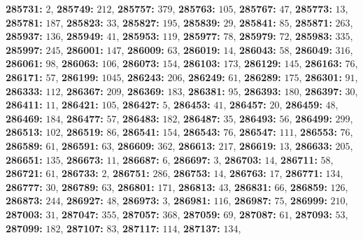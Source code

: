 \textsf{\bfseries 285731:} $2$, \textsf{\bfseries 285749:} $212$, \textsf{\bfseries 285757:} $379$, \textsf{\bfseries 285763:} $105$, \textsf{\bfseries 285767:} $47$, \textsf{\bfseries 285773:} $13$, \textsf{\bfseries 285781:} $187$, \textsf{\bfseries 285823:} $33$, \textsf{\bfseries 285827:} $195$, \textsf{\bfseries 285839:} $29$, \textsf{\bfseries 285841:} $85$, \textsf{\bfseries 285871:} $263$, \textsf{\bfseries 285937:} $136$, \textsf{\bfseries 285949:} $41$, \textsf{\bfseries 285953:} $119$, \textsf{\bfseries 285977:} $78$, \textsf{\bfseries 285979:} $72$, \textsf{\bfseries 285983:} $335$, \textsf{\bfseries 285997:} $245$, \textsf{\bfseries 286001:} $147$, \textsf{\bfseries 286009:} $63$, \textsf{\bfseries 286019:} $14$, \textsf{\bfseries 286043:} $58$, \textsf{\bfseries 286049:} $316$, \textsf{\bfseries 286061:} $98$, \textsf{\bfseries 286063:} $106$, \textsf{\bfseries 286073:} $154$, \textsf{\bfseries 286103:} $173$, \textsf{\bfseries 286129:} $145$, \textsf{\bfseries 286163:} $76$, \textsf{\bfseries 286171:} $57$, \textsf{\bfseries 286199:} $1045$, \textsf{\bfseries 286243:} $206$, \textsf{\bfseries 286249:} $61$, \textsf{\bfseries 286289:} $175$, \textsf{\bfseries 286301:} $91$, \textsf{\bfseries 286333:} $112$, \textsf{\bfseries 286367:} $209$, \textsf{\bfseries 286369:} $183$, \textsf{\bfseries 286381:} $95$, \textsf{\bfseries 286393:} $180$, \textsf{\bfseries 286397:} $30$, \textsf{\bfseries 286411:} $11$, \textsf{\bfseries 286421:} $105$, \textsf{\bfseries 286427:} $5$, \textsf{\bfseries 286453:} $41$, \textsf{\bfseries 286457:} $20$, \textsf{\bfseries 286459:} $48$, \textsf{\bfseries 286469:} $184$, \textsf{\bfseries 286477:} $57$, \textsf{\bfseries 286483:} $182$, \textsf{\bfseries 286487:} $35$, \textsf{\bfseries 286493:} $56$, \textsf{\bfseries 286499:} $299$, \textsf{\bfseries 286513:} $102$, \textsf{\bfseries 286519:} $86$, \textsf{\bfseries 286541:} $154$, \textsf{\bfseries 286543:} $76$, \textsf{\bfseries 286547:} $111$, \textsf{\bfseries 286553:} $76$, \textsf{\bfseries 286589:} $61$, \textsf{\bfseries 286591:} $63$, \textsf{\bfseries 286609:} $362$, \textsf{\bfseries 286613:} $217$, \textsf{\bfseries 286619:} $13$, \textsf{\bfseries 286633:} $205$, \textsf{\bfseries 286651:} $135$, \textsf{\bfseries 286673:} $11$, \textsf{\bfseries 286687:} $6$, \textsf{\bfseries 286697:} $3$, \textsf{\bfseries 286703:} $14$, \textsf{\bfseries 286711:} $58$, \textsf{\bfseries 286721:} $61$, \textsf{\bfseries 286733:} $2$, \textsf{\bfseries 286751:} $286$, \textsf{\bfseries 286753:} $14$, \textsf{\bfseries 286763:} $17$, \textsf{\bfseries 286771:} $134$, \textsf{\bfseries 286777:} $30$, \textsf{\bfseries 286789:} $63$, \textsf{\bfseries 286801:} $171$, \textsf{\bfseries 286813:} $43$, \textsf{\bfseries 286831:} $66$, \textsf{\bfseries 286859:} $126$, \textsf{\bfseries 286873:} $244$, \textsf{\bfseries 286927:} $48$, \textsf{\bfseries 286973:} $3$, \textsf{\bfseries 286981:} $116$, \textsf{\bfseries 286987:} $75$, \textsf{\bfseries 286999:} $210$, \textsf{\bfseries 287003:} $31$, \textsf{\bfseries 287047:} $355$, \textsf{\bfseries 287057:} $368$, \textsf{\bfseries 287059:} $69$, \textsf{\bfseries 287087:} $61$, \textsf{\bfseries 287093:} $53$, \textsf{\bfseries 287099:} $182$, \textsf{\bfseries 287107:} $83$, \textsf{\bfseries 287117:} $114$, \textsf{\bfseries 287137:} $134$, 
